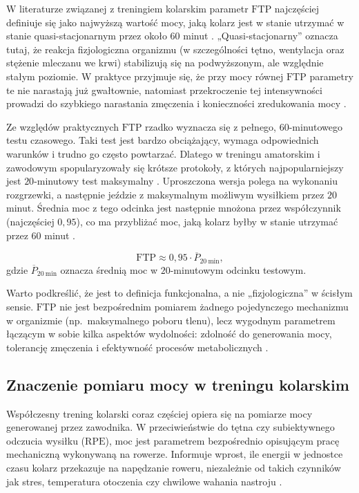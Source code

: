 W literaturze związanej z treningiem kolarskim parametr $\mathrm{FTP}$ najczęściej definiuje się jako najwyższą wartość mocy, jaką kolarz jest w stanie utrzymać w stanie quasi-stacjonarnym przez około $60$ minut \cite{borszcz2018ftp,allen2019power}.
„Quasi-stacjonarny” oznacza tutaj, że reakcja fizjologiczna organizmu (w szczególności tętno, wentylacja oraz stężenie mleczanu we krwi) stabilizują się na podwyższonym, ale względnie stałym poziomie.
W praktyce przyjmuje się, że przy mocy równej $\mathrm{FTP}$ parametry te nie narastają już gwałtownie, natomiast przekroczenie tej intensywności prowadzi do szybkiego narastania zmęczenia i konieczności zredukowania mocy \cite{borszcz2018ftp,karsten2021cpftp}.

Ze względów praktycznych $\mathrm{FTP}$ rzadko wyznacza się z pełnego, $60$-minutowego testu czasowego.
Taki test jest bardzo obciążający, wymaga odpowiednich warunków i trudno go często powtarzać.
Dlatego w treningu amatorskim i zawodowym spopularyzowały się krótsze protokoły, z których najpopularniejszy jest $20$-minutowy test maksymalny \cite{allen2019power}.
Uproszczona wersja polega na wykonaniu rozgrzewki, a następnie jeździe z maksymalnym możliwym wysiłkiem  przez $20$ minut.
Średnia moc z tego odcinka jest następnie mnożona przez współczynnik (najczęściej $0{,}95$), co ma przybliżać moc, jaką kolarz byłby w stanie utrzymać przez $60$ minut \cite{allen2019power,sitko2023update}.

\begin{equation}
\label{eq:ftp_20min}
\mathrm{FTP} \approx 0{,}95 \cdot \overline{P}_{20\ \mathrm{min}},
\end{equation}
gdzie $\overline{P}_{20\ \mathrm{min}}$ oznacza średnią moc w $20$-minutowym odcinku testowym.

Warto podkreślić, że jest to definicja funkcjonalna, a nie „fizjologiczna” w ścisłym sensie.
$\mathrm{FTP}$ nie jest bezpośrednim pomiarem żadnego pojedynczego mechanizmu w organizmie (np.\ maksymalnego poboru tlenu), lecz wygodnym parametrem łączącym w sobie kilka aspektów wydolności: zdolność do generowania mocy, tolerancję zmęczenia i efektywność procesów metabolicznych \cite{borszcz2018ftp,karsten2021cpftp}.

\subsection{Znaczenie pomiaru mocy w treningu kolarskim}

Współczesny trening kolarski coraz częściej opiera się na pomiarze mocy generowanej przez zawodnika.
W przeciwieństwie do tętna czy subiektywnego odczucia wysiłku ($\mathrm{RPE}$), moc jest parametrem bezpośrednio opisującym pracę mechaniczną wykonywaną na rowerze.
Informuje wprost, ile energii w jednostce czasu kolarz przekazuje na napędzanie roweru, niezależnie od takich czynników jak stres, temperatura otoczenia czy chwilowe wahania nastroju \cite{allen2019power,phases2023ftp}.

